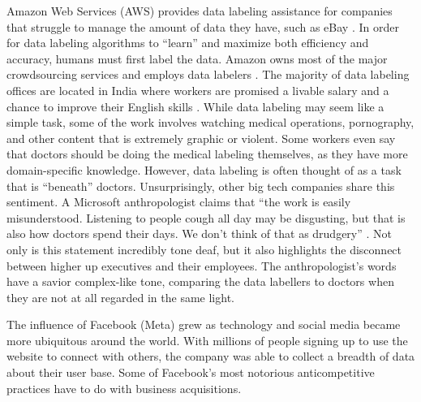 \documentclass[twoside]{article}
\begin{document}
Amazon Web Services (AWS) provides data labeling assistance for companies that struggle to manage the amount of data they have, such as eBay \cite{aws}. In order for data labeling algorithms to ``learn'' and maximize both efficiency and accuracy, humans must first label the data. Amazon owns most of the major crowdsourcing services and employs data labelers \cite{ai}. The majority of data labeling offices are located in India where workers are promised a livable salary and a chance to improve their English skills \cite{ai}. While data labeling may seem like a simple task, some of the work involves watching medical operations, pornography, and other content that is extremely graphic or violent. Some workers even say that doctors should be doing the medical labeling themselves, as they have more domain-specific knowledge. However, data labeling is often thought of as a task that is “beneath” doctors. Unsurprisingly, other big tech companies share this sentiment. A Microsoft anthropologist claims that “the work is easily misunderstood. Listening to people cough all day may be disgusting, but that is also how doctors spend their days. We don’t think of that as drudgery” \cite{ai}. Not only is this statement incredibly tone deaf, but it also highlights the disconnect between higher up executives and their employees. The anthropologist’s words have a savior complex-like tone, comparing the data labellers to doctors when they are not at all regarded in the same light.

The influence of Facebook (Meta) grew as technology and social media became more ubiquitous around the world. With millions of people signing up to use the website to connect with others, the company was able to collect a breadth of data about their user base. Some of Facebook’s most notorious anticompetitive practices have to do with business acquisitions.
\end{document}
